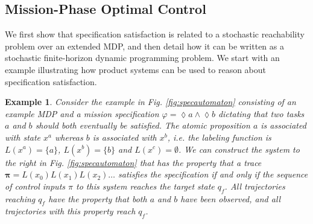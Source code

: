 \documentclass[conference]{IEEEtran}
\newtheorem{example}{Example}
\begin{document}
\subsection{Mission-Phase Optimal Control}
We first show that specification satisfaction is related to a stochastic reachability problem over an extended MDP, and then detail how it can be written as a stochastic finite-horizon dynamic programming problem. We start with an example illustrating how product systems can be used to reason about specification satisfaction.

\begin{example}
\label{example:automaton}
Consider the example in Fig. \ref{fig:specautomaton} consisting of an example MDP and a mission specification $\varphi = \lozenge a \wedge \lozenge b$ dictating that two tasks $a$ and $b$ should both eventually be satisfied. The atomic proposition $a$ is associated with state $x^a$ whereas $b$ is associated with $x^b$, i.e. the labeling function is $L(x^a) = \{ a \}$, $L(x^b) = \{b \}$ and $L(x^c) =\emptyset$. We can construct the system to the right in Fig. \ref{fig:specautomaton} that has the property that a trace $\mathbf \pi=L(x_0) L(x_1) L(x_2)\ldots$ satisfies the specification if and only if the sequence of control inputs $\pi$ to this system reaches the target state $q_f$. All trajectories reaching $q_f$ have the property that both $a$ and $b$ have been observed, and all trajectories with this property reach $q_f$.

\begin{figure}[htp]
\end{figure}
\end{example}
\end{document}
